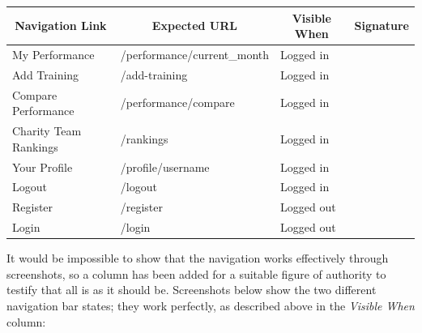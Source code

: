 \documentclass{article}[12pt,a4paper]
\begin{document}
\begin{table}[h]
\begin{tabular}{|l|l|l|l|}
\hline
\multicolumn{1}{|c|}{\textbf{Navigation Link}} & \multicolumn{1}{c|}{\textbf{Expected URL}} & \multicolumn{1}{c|}{\textbf{Visible When}} & \multicolumn{1}{c|}{\textbf{Signature}} \\ \hline
My Performance                                 & /performance/current\_month                & Logged in                                  &                                                 \\ \hline
Add Training                                   & /add-training                              & Logged in                                  &                                                 \\ \hline
Compare Performance                            & /performance/compare                       & Logged in                                  &                                                 \\ \hline
Charity Team Rankings                          & /rankings                                  & Logged in                                  &                                                 \\ \hline
Your Profile                                   & /profile/username                          & Logged in                                  &                                                 \\ \hline
Logout                                         & /logout                                    & Logged in                                  &                                                 \\ \hline
Register                                       & /register                                  & Logged out                                 &                                                 \\ \hline
Login                                          & /login                                     & Logged out                                 &                                                 \\ \hline
\end{tabular}
\end{table}

It would be impossible to show that the navigation works effectively through screenshots, so a column has been added for a suitable figure of authority to testify that all is as it should be. Screenshots below show the two different navigation bar states; they work perfectly, as described above in the \textit{Visible When} column:
\end{document}
